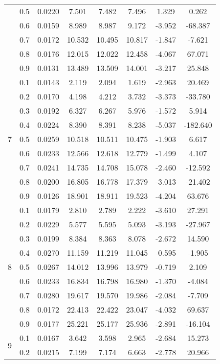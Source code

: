 \documentclass[11pt,a4paper]{report}
\begin{document}
\begin{longtable}{ | c | c || c | c | c | c | c | c | }
 & 0.5 & 0.0220 & 7.501 & 7.482 & 7.496 & 1.329 & 0.262 \\
 & 0.6 & 0.0159 & 8.989 & 8.987 & 9.172 & -3.952 & -68.387 \\
 & 0.7 & 0.0172 & 10.532 & 10.495 & 10.817 & -1.847 & -7.621 \\
 & 0.8 & 0.0176 & 12.015 & 12.022 & 12.458 & -4.067 & 67.071 \\
 & 0.9 & 0.0131 & 13.489 & 13.509 & 14.001 & -3.217 & 25.848 \\
 \hline
\multirow{9}{*}{7} & 0.1 & 0.0143 & 2.119 & 2.094 & 1.619 & -2.963 & 20.469 \\
 & 0.2 & 0.0170 & 4.198 & 4.212 & 3.732 & -3.373 & -33.780 \\
 & 0.3 & 0.0192 & 6.327 & 6.267 & 5.976 & -1.572 & 5.914 \\
 & 0.4 & 0.0224 & 8.390 & 8.391 & 8.238 & -5.037 & -182.640 \\
 & 0.5 & 0.0259 & 10.518 & 10.511 & 10.475 & -1.903 & 6.617 \\
 & 0.6 & 0.0233 & 12.566 & 12.618 & 12.779 & -1.499 & 4.107 \\
 & 0.7 & 0.0241 & 14.735 & 14.708 & 15.078 & -2.460 & -12.592 \\
 & 0.8 & 0.0200 & 16.805 & 16.778 & 17.379 & -3.013 & -21.402 \\
 & 0.9 & 0.0126 & 18.901 & 18.911 & 19.523 & -4.204 & 63.676 \\
 \hline
\multirow{9}{*}{8} & 0.1 & 0.0179 & 2.810 & 2.789 & 2.222 & -3.610 & 27.291 \\
 & 0.2 & 0.0229 & 5.577 & 5.595 & 5.093 & -3.193 & -27.967 \\
 & 0.3 & 0.0199 & 8.384 & 8.363 & 8.078 & -2.672 & 14.590 \\
 & 0.4 & 0.0270 & 11.159 & 11.219 & 11.045 & -0.595 & -1.905 \\
 & 0.5 & 0.0267 & 14.012 & 13.996 & 13.979 & -0.719 & 2.109 \\
 & 0.6 & 0.0233 & 16.834 & 16.798 & 16.980 & -1.370 & -4.084 \\
 & 0.7 & 0.0280 & 19.617 & 19.570 & 19.986 & -2.084 & -7.709 \\
 & 0.8 & 0.0172 & 22.413 & 22.422 & 23.047 & -4.032 & 69.637 \\
 & 0.9 & 0.0177 & 25.221 & 25.177 & 25.936 & -2.891 & -16.104 \\
 \hline
\multirow{9}{*}{9} & 0.1 & 0.0167 & 3.642 & 3.598 & 2.965 & -2.684 & 15.273 \\
 & 0.2 & 0.0215 & 7.199 & 7.174 & 6.663 & -2.778 & 20.966 \\

\end{longtable}
\end{document}
